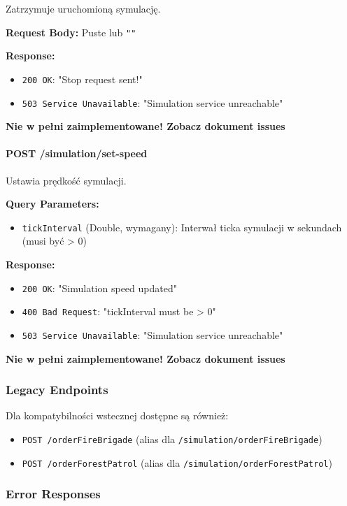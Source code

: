 Zatrzymuje uruchomioną symulację.

\textbf{Request Body:} Puste lub \texttt{""}

\textbf{Response:}
\begin{itemize}
    \item \texttt{200 OK}: "Stop request sent!"
    \item \texttt{503 Service Unavailable}: "Simulation service unreachable"
\end{itemize}

\textbf{Nie w pełni zaimplementowane! Zobacz dokument issues}

\paragraph{POST /simulation/set-speed}

Ustawia prędkość symulacji.

\textbf{Query Parameters:}
\begin{itemize}
    \item \texttt{tickInterval} (Double, wymagany): Interwał ticka symulacji w sekundach (musi być > 0)
\end{itemize}

\textbf{Response:}
\begin{itemize}
    \item \texttt{200 OK}: "Simulation speed updated"
    \item \texttt{400 Bad Request}: "tickInterval must be > 0"
    \item \texttt{503 Service Unavailable}: "Simulation service unreachable"
\end{itemize}

\textbf{Nie w pełni zaimplementowane! Zobacz dokument issues}

\subsubsection{Legacy Endpoints}

Dla kompatybilności wstecznej dostępne są również:
\begin{itemize}
    \item \texttt{POST /orderFireBrigade} (alias dla \texttt{/simulation/orderFireBrigade})
    \item \texttt{POST /orderForestPatrol} (alias dla \texttt{/simulation/orderForestPatrol})
\end{itemize}

\subsubsection{Error Responses}

